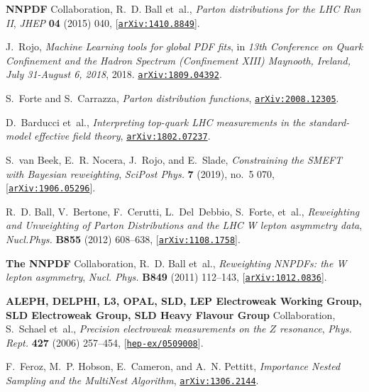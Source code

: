 \documentclass[11pt,a4paper]{article}
\numberwithin{equation}{section}
\numberwithin{figure}{section}
\numberwithin{table}{section}
\begin{document}
\begin{thebibliography}{100}
{\bf NNPDF} Collaboration, R.~D. Ball et~al., {\it {Parton distributions for
  the LHC Run II}},  {\em JHEP} {\bf 04} (2015) 040,
  [\href{http://arxiv.org/abs/1410.8849}{{\tt arXiv:1410.8849}}].

J.~Rojo, {\it {Machine Learning tools for global PDF fits}},  in {\em {13th
  Conference on Quark Confinement and the Hadron Spectrum (Confinement XIII)
  Maynooth, Ireland, July 31-August 6, 2018}}, 2018.
\newblock \href{http://arxiv.org/abs/1809.04392}{{\tt arXiv:1809.04392}}.

S.~Forte and S.~Carrazza, {\it {Parton distribution functions}},
  \href{http://arxiv.org/abs/2008.12305}{{\tt arXiv:2008.12305}}.

D.~Barducci et~al., {\it {Interpreting top-quark LHC measurements in the
  standard-model effective field theory}},
  \href{http://arxiv.org/abs/1802.07237}{{\tt arXiv:1802.07237}}.

S.~van Beek, E.~R. Nocera, J.~Rojo, and E.~Slade, {\it {Constraining the SMEFT
  with Bayesian reweighting}},  {\em SciPost Phys.} {\bf 7} (2019), no.~5 070,
  [\href{http://arxiv.org/abs/1906.05296}{{\tt arXiv:1906.05296}}].

R.~D. Ball, V.~Bertone, F.~Cerutti, L.~Del~Debbio, S.~Forte, et~al., {\it
  {Reweighting and Unweighting of Parton Distributions and the LHC W lepton
  asymmetry data}},  {\em Nucl.Phys.} {\bf B855} (2012) 608--638,
  [\href{http://arxiv.org/abs/1108.1758}{{\tt arXiv:1108.1758}}].

{\bf The NNPDF} Collaboration, R.~D. Ball et~al., {\it {Reweighting NNPDFs: the
  W lepton asymmetry}},  {\em Nucl. Phys.} {\bf B849} (2011) 112--143,
  [\href{http://arxiv.org/abs/1012.0836}{{\tt arXiv:1012.0836}}].

{\bf ALEPH, DELPHI, L3, OPAL, SLD, LEP Electroweak Working Group, SLD
  Electroweak Group, SLD Heavy Flavour Group} Collaboration, S.~Schael et~al.,
  {\it {Precision electroweak measurements on the $Z$ resonance}},  {\em Phys.
  Rept.} {\bf 427} (2006) 257--454,
  [\href{http://arxiv.org/abs/hep-ex/0509008}{{\tt hep-ex/0509008}}].

F.~Feroz, M.~P. Hobson, E.~Cameron, and A.~N. Pettitt, {\it {Importance Nested
  Sampling and the MultiNest Algorithm}},
  \href{http://arxiv.org/abs/1306.2144}{{\tt arXiv:1306.2144}}.


\end{thebibliography}
\end{document}
